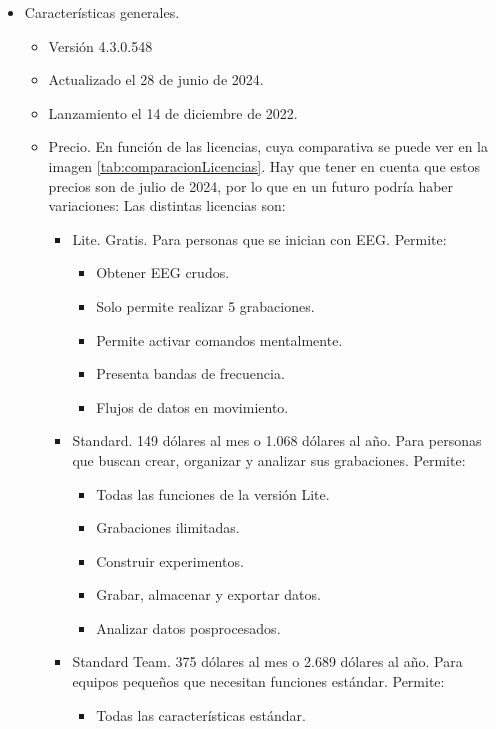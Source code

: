\begin{itemize}
    \item Características generales.
    \begin{itemize}
        \item Versión 4.3.0.548
        \item Actualizado el 28 de junio de 2024.
        \item Lanzamiento el 14 de diciembre de 2022.
        \item Precio. En función de las licencias, cuya comparativa se puede ver en la imagen \ref{tab:comparacionLicencias}. Hay que tener en cuenta que estos precios son de julio de 2024, por lo que en un futuro podría haber variaciones: Las distintas licencias son:
        \begin{itemize}
            \item Lite. Gratis. Para personas que se inician con EEG. Permite: 
            \begin{itemize}
                \item Obtener EEG crudos.
                \item Solo permite realizar 5 grabaciones.
                \item Permite activar comandos mentalmente.
                \item Presenta bandas de frecuencia.
                \item Flujos de datos en movimiento.
            \end{itemize}
            \item Standard. 149 dólares al mes o 1.068 dólares al año. Para personas que buscan crear, organizar y analizar sus grabaciones. Permite:
            \begin{itemize}
                \item Todas las funciones de la versión Lite.
                \item Grabaciones ilimitadas.
                \item Construir experimentos.
                \item Grabar, almacenar y exportar datos.
                \item Analizar datos posprocesados.
            \end{itemize}
            \item Standard Team. 375 dólares al mes o 2.689 dólares al año. Para equipos pequeños que necesitan funciones estándar. Permite:
            \begin{itemize}
                \item Todas las características estándar.

\end{itemize}
\end{itemize}
\end{itemize}
\end{itemize}
